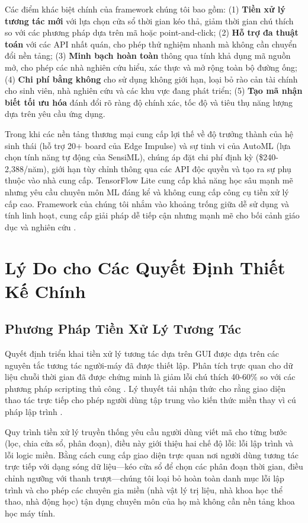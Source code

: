 Các điểm khác biệt chính của framework chúng tôi bao gồm: (1) \textbf{Tiền xử lý tương tác mới} với lựa chọn cửa sổ thời gian kéo thả, giảm thời gian chú thích so với các phương pháp dựa trên mã hoặc point-and-click; (2) \textbf{Hỗ trợ đa thuật toán} với các API nhất quán, cho phép thử nghiệm nhanh mà không cần chuyển đổi nền tảng; (3) \textbf{Minh bạch hoàn toàn} thông qua tính khả dụng mã nguồn mở, cho phép các nhà nghiên cứu hiểu, xác thực và mở rộng toàn bộ đường ống; (4) \textbf{Chi phí bằng không} cho sử dụng không giới hạn, loại bỏ rào cản tài chính cho sinh viên, nhà nghiên cứu và các khu vực đang phát triển; (5) \textbf{Tạo mã nhận biết tối ưu hóa} đánh đổi rõ ràng độ chính xác, tốc độ và tiêu thụ năng lượng dựa trên yêu cầu ứng dụng.

Trong khi các nền tảng thương mại cung cấp lợi thế về độ trưởng thành của hệ sinh thái (hỗ trợ 20+ board của Edge Impulse) và sự tinh vi của AutoML (lựa chọn tính năng tự động của SensiML), chúng áp đặt chi phí định kỳ (\$240-2,388/năm), giới hạn tùy chỉnh thông qua các API độc quyền và tạo ra sự phụ thuộc vào nhà cung cấp. TensorFlow Lite cung cấp khả năng học sâu mạnh mẽ nhưng yêu cầu chuyên môn ML đáng kể và không cung cấp công cụ tiền xử lý cấp cao. Framework của chúng tôi nhắm vào khoảng trống giữa dễ sử dụng và tính linh hoạt, cung cấp giải pháp dễ tiếp cận nhưng mạnh mẽ cho bối cảnh giáo dục và nghiên cứu \cite{web:Edge_Impulse,web:TensorFlowLite}.

\section{Lý Do cho Các Quyết Định Thiết Kế Chính}

\subsection{Phương Pháp Tiền Xử Lý Tương Tác}

Quyết định triển khai tiền xử lý tương tác dựa trên GUI được dựa trên các nguyên tắc tương tác người-máy đã được thiết lập. Phân tích trực quan cho dữ liệu chuỗi thời gian đã được chứng minh là giảm lỗi chú thích 40-60\% so với các phương pháp scripting thủ công \cite{munzner2014visualization}. Lý thuyết tải nhận thức cho rằng giao diện thao tác trực tiếp cho phép người dùng tập trung vào kiến thức miền thay vì cú pháp lập trình \cite{sweller1988cognitive}.

Quy trình tiền xử lý truyền thống yêu cầu người dùng viết mã cho từng bước (lọc, chia cửa sổ, phân đoạn), điều này giới thiệu hai chế độ lỗi: lỗi lập trình và lỗi logic miền. Bằng cách cung cấp giao diện trực quan nơi người dùng tương tác trực tiếp với dạng sóng dữ liệu—kéo cửa sổ để chọn các phân đoạn thời gian, điều chỉnh ngưỡng với thanh trượt—chúng tôi loại bỏ hoàn toàn danh mục lỗi lập trình và cho phép các chuyên gia miền (nhà vật lý trị liệu, nhà khoa học thể thao, nhà động học) tận dụng chuyên môn của họ mà không cần nền tảng khoa học máy tính.

